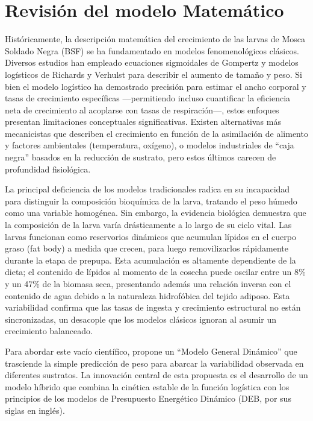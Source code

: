 \chapter{Revisión del modelo Matemático}

Históricamente, la descripción matemática del crecimiento de las larvas de Mosca Soldado Negra (BSF) se ha fundamentado en modelos fenomenológicos clásicos. Diversos estudios han empleado ecuaciones sigmoidales de Gompertz y modelos logísticos de Richards y Verhulst para describir el aumento de tamaño y peso. Si bien el modelo logístico ha demostrado precisión para estimar el ancho corporal y tasas de crecimiento específicas —permitiendo incluso cuantificar la eficiencia neta de crecimiento al acoplarse con tasas de respiración—, estos enfoques presentan limitaciones conceptuales significativas. Existen alternativas más mecanicistas que describen el crecimiento en función de la asimilación de alimento y factores ambientales (temperatura, oxígeno), o modelos industriales de ``caja negra'' basados en la reducción de sustrato, pero estos últimos carecen de profundidad fisiológica.

La principal deficiencia de los modelos tradicionales radica en su incapacidad para distinguir la composición bioquímica de la larva, tratando el peso húmedo como una variable homogénea. Sin embargo, la evidencia biológica demuestra que la composición de la larva varía drásticamente a lo largo de su ciclo vital. Las larvas funcionan como reservorios dinámicos que acumulan lípidos en el cuerpo graso (fat body) a medida que crecen, para luego removilizarlos rápidamente durante la etapa de prepupa. Esta acumulación es altamente dependiente de la dieta; el contenido de lípidos al momento de la cosecha puede oscilar entre un 8\% y un 47\% de la biomasa seca, presentando además una relación inversa con el contenido de agua debido a la naturaleza hidrofóbica del tejido adiposo. Esta variabilidad confirma que las tasas de ingesta y crecimiento estructural no están sincronizadas, un desacople que los modelos clásicos ignoran al asumir un crecimiento balanceado.

Para abordar este vacío científico, \cite{eriksenDynamicModellingFeed2022}  propone un ``Modelo General Dinámico'' que trasciende la simple predicción de peso para abarcar la variabilidad observada en diferentes sustratos. La innovación central de esta propuesta es el desarrollo de un modelo híbrido que combina la cinética estable de la función logística con los principios de los modelos de Presupuesto Energético Dinámico (DEB, por sus siglas en inglés).

